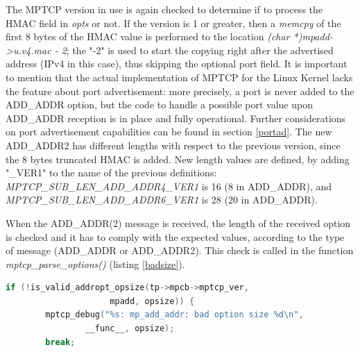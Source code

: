 The MPTCP version in use is again checked to determine if to process the HMAC field in \textit{opts} or not. If the version is 1 or greater, then a \textit{memcpy} of the first 8 bytes of the HMAC value is performed to the location \textit{(char *)mpadd->u.v4.mac - 2}; the "-2" is used to start the copying right after the advertised address (IPv4 in this case), thus skipping the optional port field. It is important to mention that the actual implementation of MPTCP for the Linux Kernel lacks the feature about port advertisement: more precisely, a port is never added to the ADD\_ADDR option, but the code to handle a possible port value upon ADD\_ADDR reception is in place and fully operational. Further considerations on port advertisement capabilities can be found in section \ref{portad}. The new ADD\_ADDR2 has different lengths with respect to the previous version, since the 8 bytes truncated HMAC is added. New length values are defined, by adding "\_VER1" to the name of the previous definitions: \textit{MPTCP\_SUB\_LEN\_ADD\_ADDR4\_VER1} is 16 (8 in ADD\_ADDR), and \textit{MPTCP\_SUB\_LEN\_ADD\_ADDR6\_VER1} is 28 (20 in ADD\_ADDR). 

When the ADD\_ADDR(2) message is received, the length of the received option is checked and it has to comply with the expected values, according to the type of message (ADD\_ADDR or ADD\_ADDR2). This check is called in the function \textit{mptcp\_parse\_options()} (listing \ref{badsize}).

\begin{lstlisting}[language=c, caption=\textit{Check ADD\_ADDR size at the receiver, inside \textit{mptcp\_parse\_option()}}, label=badsize]
	if (!is_valid_addropt_opsize(tp->mpcb->mptcp_ver,
				     mpadd, opsize)) {
 		mptcp_debug("%s: mp_add_addr: bad option size %d\n",
 			    __func__, opsize);
 		break;
\end{lstlisting}

